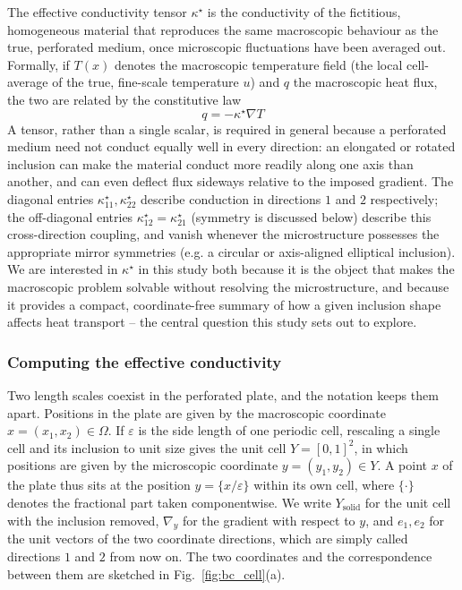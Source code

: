 \documentclass{article}
\makeatletter
\providecommand\FloatBarrier{\par\begingroup\let\@elt\relax
  \edef\@tempa{\@botlist\@deferlist\@dbldeferlist}%
  \ifx\@tempa\@empty\else\clearpage\fi\endgroup}
\newcommand{\tmop}[1]{\ensuremath{\operatorname{#1}}}
\makeatother
\begin{document}
The effective conductivity tensor $\kappa^{\star}$ is the conductivity of the
fictitious, homogeneous material that reproduces the same macroscopic
behaviour as the true, perforated medium, once microscopic fluctuations have
been averaged out. Formally, if $T (x)$ denotes the macroscopic
temperature field (the local cell-average of the true, fine-scale temperature
$u$) and $q$ the macroscopic heat flux, the two are related by the
constitutive law
\begin{equation}
  \label{eq:constitutive}
  q = - \kappa^{\star} \nabla T
\end{equation}
A tensor, rather than a single scalar, is required in general because a
perforated medium need not conduct equally well in every direction: an
elongated or rotated inclusion can make the material conduct more readily
along one axis than another, and can even deflect flux sideways relative to
the imposed gradient. The diagonal entries $\kappa^{\star}_{11},
\kappa^{\star}_{22}$ describe conduction in directions $1$ and $2$ respectively; the
off-diagonal entries $\kappa^{\star}_{12} = \kappa^{\star}_{21}$ (symmetry is
discussed below) describe this cross-direction coupling, and vanish whenever
the microstructure possesses the appropriate mirror symmetries (e.g. a
circular or axis-aligned elliptical inclusion). We are interested in
$\kappa^{\star}$ in this study both because it is the object that makes the
macroscopic problem solvable without resolving the microstructure, and
because it provides a compact, coordinate-free summary of how a given
inclusion shape affects heat transport -- the central question this study
sets out to explore.

\FloatBarrier
\subsubsection{Computing the effective conductivity}
\label{sec:cell_problem}

Two length scales coexist in the perforated plate, and the notation keeps them
apart. Positions in the plate are given by the macroscopic coordinate
$x = (x_1, x_2) \in \Omega$. If $\varepsilon$ is the side length of one periodic
cell, rescaling a single cell and its inclusion to unit size gives the unit
cell $Y = [0, 1]^2$, in which positions are given by the microscopic coordinate
$y = (y_1, y_2) \in Y$. A point $x$ of the plate thus sits at the position
$y = \{ x / \varepsilon \}$ within its own cell, where $\{ \cdot \}$ denotes the
fractional part taken componentwise. We write $Y_{\tmop{solid}}$ for the unit
cell with the inclusion removed, $\nabla_y$ for the gradient with respect to
$y$, and $e_1, e_2$ for the unit vectors of the two coordinate directions,
which are simply called directions $1$ and $2$ from now on. The two coordinates
and the correspondence between them are sketched in Fig.~\ref{fig:bc_cell}(a).
\end{document}
